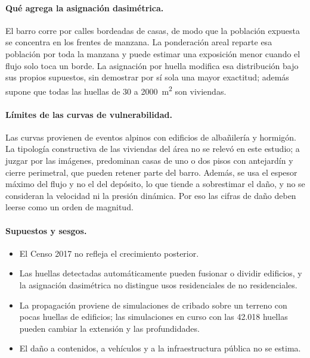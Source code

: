 \documentclass[10pt,a4paper]{article}
\begin{document}
\paragraph{Qué agrega la asignación dasimétrica.} El barro corre por calles bordeadas de casas, de modo que la población expuesta se concentra en los frentes de manzana. La ponderación areal reparte esa población por toda la manzana y puede estimar una exposición menor cuando el flujo solo toca un borde. La asignación por huella modifica esa distribución bajo sus propios supuestos, sin demostrar por sí sola una mayor exactitud; además supone que todas las huellas de 30 a \SI{2000}{m^2} son viviendas.
\paragraph{Límites de las curvas de vulnerabilidad.} Las curvas provienen de eventos alpinos con edificios de albañilería y hormigón. La tipología constructiva de las viviendas del área no se relevó en este estudio; a juzgar por las imágenes, predominan casas de uno o dos pisos con antejardín y cierre perimetral, que pueden retener parte del barro. Además, se usa el espesor máximo del flujo y no el del depósito, lo que tiende a sobrestimar el daño, y no se consideran la velocidad ni la presión dinámica. Por eso las cifras de daño deben leerse como un orden de magnitud.
\paragraph{Supuestos y sesgos.}
\begin{itemize}
\item El Censo 2017 no refleja el crecimiento posterior.
\item Las huellas detectadas automáticamente pueden fusionar o dividir edificios, y la asignación dasimétrica no distingue usos residenciales de no residenciales.
\item La propagación proviene de simulaciones de cribado sobre un terreno con pocas huellas de edificios; las simulaciones en curso con las 42.018 huellas pueden cambiar la extensión y las profundidades.
\item El daño a contenidos, a vehículos y a la infraestructura pública no se estima.
\end{itemize}
\end{document}
